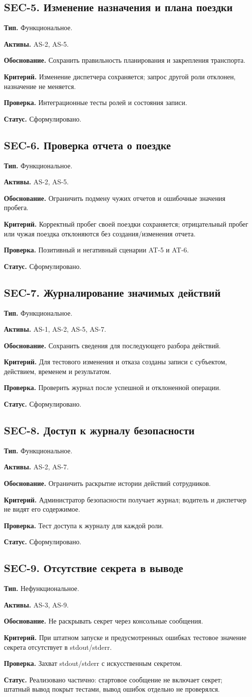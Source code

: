 \documentclass[12pt,a4paper]{article}
\newcommand{\field}[2]{\noindent\textbf{#1.} #2\par}
\begin{document}
\subsection*{SEC-5. Изменение назначения и плана поездки}
\field{Тип}{Функциональное.}
\field{Активы}{AS-2, AS-5.}
\field{Обоснование}{Сохранить правильность планирования и закрепления транспорта.}
\field{Критерий}{Изменение диспетчера сохраняется; запрос другой роли отклонен, назначение не меняется.}
\field{Проверка}{Интеграционные тесты ролей и состояния записи.}
\field{Статус}{Сформулировано.}

\subsection*{SEC-6. Проверка отчета о поездке}
\field{Тип}{Функциональное.}
\field{Активы}{AS-2, AS-5.}
\field{Обоснование}{Ограничить подмену чужих отчетов и ошибочные значения пробега.}
\field{Критерий}{Корректный пробег своей поездки сохраняется; отрицательный пробег или чужая поездка отклоняются без создания/изменения отчета.}
\field{Проверка}{Позитивный и негативный сценарии AT-5 и AT-6.}
\field{Статус}{Сформулировано.}

\subsection*{SEC-7. Журналирование значимых действий}
\field{Тип}{Функциональное.}
\field{Активы}{AS-1, AS-2, AS-5, AS-7.}
\field{Обоснование}{Сохранить сведения для последующего разбора действий.}
\field{Критерий}{Для тестового изменения и отказа созданы записи с субъектом, действием, временем и результатом.}
\field{Проверка}{Проверить журнал после успешной и отклоненной операции.}
\field{Статус}{Сформулировано.}

\subsection*{SEC-8. Доступ к журналу безопасности}
\field{Тип}{Функциональное.}
\field{Активы}{AS-2, AS-7.}
\field{Обоснование}{Ограничить раскрытие истории действий сотрудников.}
\field{Критерий}{Администратор безопасности получает журнал; водитель и диспетчер не видят его содержимое.}
\field{Проверка}{Тест доступа к журналу для каждой роли.}
\field{Статус}{Сформулировано.}

\subsection*{SEC-9. Отсутствие секрета в выводе}
\field{Тип}{Нефункциональное.}
\field{Активы}{AS-3, AS-9.}
\field{Обоснование}{Не раскрывать секрет через консольные сообщения.}
\field{Критерий}{При штатном запуске и предусмотренных ошибках тестовое значение секрета отсутствует в stdout/stderr.}
\field{Проверка}{Захват stdout/stderr с искусственным секретом.}
\field{Статус}{Реализовано частично: стартовое сообщение не включает секрет; штатный вывод покрыт тестами, вывод ошибок отдельно не проверялся.}
\end{document}
